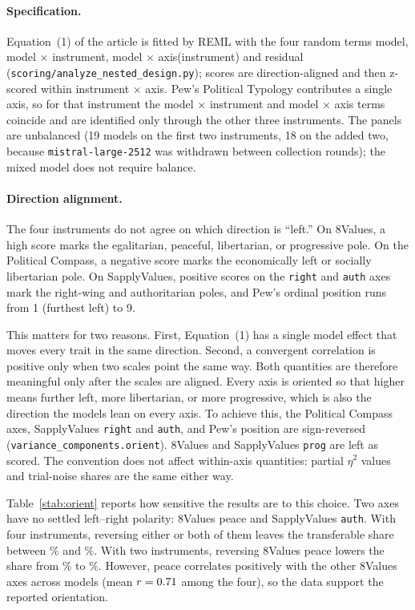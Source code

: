 \documentclass[12pt]{article}
\begin{document}
\paragraph{Specification.} Equation~(1) of the article is fitted by
REML with the four random terms model, model $\times$ instrument, model
$\times$ axis(instrument) and residual
(\texttt{scoring/analyze\_nested\_design.py}); scores are direction-aligned
and then z-scored within instrument $\times$ axis. Pew's Political Typology contributes a single
axis, so for that instrument the model $\times$ instrument and model $\times$
axis terms coincide and are identified only through the other three
instruments. The panels are unbalanced (19 models on the first two
instruments, 18 on the added two, because \texttt{mistral-large-2512} was
withdrawn between collection rounds); the mixed model does not require balance.

\paragraph{Direction alignment.} The four instruments do not agree on which direction is ``left.'' On 8Values, a high score marks the
egalitarian, peaceful, libertarian, or progressive pole. On the Political Compass, a negative score marks
the economically left or socially libertarian pole. On SapplyValues, positive scores on the \texttt{right} and \texttt{auth}
axes mark the right-wing and authoritarian poles, and Pew's ordinal position runs from 1 (furthest left) to 9.

This matters for two reasons. First, Equation~(1) has a single model effect that moves every trait in the
same direction. Second, a convergent correlation is positive only when two scales point the same way.
Both quantities are therefore meaningful only after the scales are aligned. Every axis is oriented so that
higher means further left, more libertarian, or more progressive, which is also the direction the models
lean on every axis. To achieve this, the Political Compass axes, SapplyValues \texttt{right} and \texttt{auth}, and Pew's
position are sign-reversed (\texttt{variance\_components.orient}). 8Values and SapplyValues \texttt{prog} are left as
scored. The convention does not affect within-axis quantities: partial $\eta^2$ values and trial-noise shares are
the same either way.

Table~\ref{stab:orient} reports how sensitive the results are to this choice. Two axes have no settled left--right polarity:
8Values peace and SapplyValues \texttt{auth}. With four instruments, reversing either or both of them leaves the
transferable share between \OrientFourMin\% and \OrientFourMax\%. With two instruments, reversing 8Values peace lowers the
share from \NTwoM\% to \OrientTwoMin\%. However, peace correlates positively with the other 8Values axes across
models (mean $r=0.71$ among the four), so the data support the reported orientation.
\end{document}
